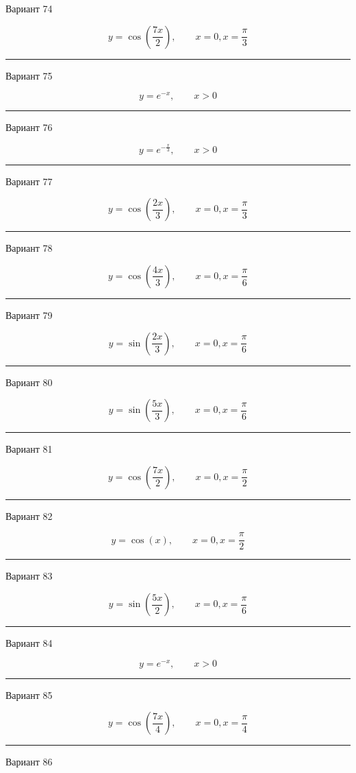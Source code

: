 \documentclass[11pt]{report}
\begin{document}
Вариант 74

$$y=\cos{\left(\frac{7 x}{2} \right)}, \qquad x = 0, x = \frac{\pi}{3}$$

\rule{\textwidth}{.2mm}

Вариант 75

$$y=e^{- x}, \qquad x > 0$$

\rule{\textwidth}{.2mm}

Вариант 76

$$y=e^{- \frac{x}{3}}, \qquad x > 0$$

\rule{\textwidth}{.2mm}

Вариант 77

$$y=\cos{\left(\frac{2 x}{3} \right)}, \qquad x = 0, x = \frac{\pi}{3}$$

\rule{\textwidth}{.2mm}

Вариант 78

$$y=\cos{\left(\frac{4 x}{3} \right)}, \qquad x = 0, x = \frac{\pi}{6}$$

\rule{\textwidth}{.2mm}

Вариант 79

$$y=\sin{\left(\frac{2 x}{3} \right)}, \qquad x = 0, x = \frac{\pi}{6}$$

\rule{\textwidth}{.2mm}

Вариант 80

$$y=\sin{\left(\frac{5 x}{3} \right)}, \qquad x = 0, x = \frac{\pi}{6}$$

\rule{\textwidth}{.2mm}

Вариант 81

$$y=\cos{\left(\frac{7 x}{2} \right)}, \qquad x = 0, x = \frac{\pi}{2}$$

\rule{\textwidth}{.2mm}

Вариант 82

$$y=\cos{\left(x \right)}, \qquad x = 0, x = \frac{\pi}{2}$$

\rule{\textwidth}{.2mm}

Вариант 83

$$y=\sin{\left(\frac{5 x}{2} \right)}, \qquad x = 0, x = \frac{\pi}{6}$$

\rule{\textwidth}{.2mm}

Вариант 84

$$y=e^{- x}, \qquad x > 0$$

\rule{\textwidth}{.2mm}

Вариант 85

$$y=\cos{\left(\frac{7 x}{4} \right)}, \qquad x = 0, x = \frac{\pi}{4}$$

\rule{\textwidth}{.2mm}
Вариант 86
\end{document}
